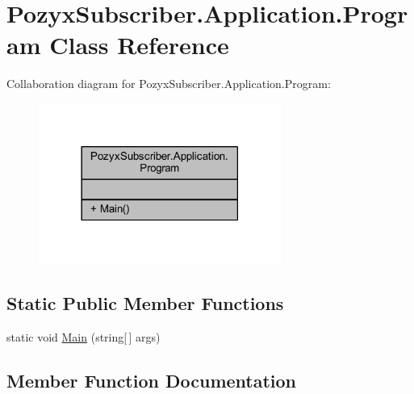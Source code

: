 \hypertarget{class_pozyx_subscriber_1_1_application_1_1_program}{}\section{Pozyx\+Subscriber.\+Application.\+Program Class Reference}
\label{class_pozyx_subscriber_1_1_application_1_1_program}


Collaboration diagram for Pozyx\+Subscriber.\+Application.\+Program\+:
\nopagebreak
\begin{figure}[H]
\begin{center}
\leavevmode
\includegraphics[width=225pt]{class_pozyx_subscriber_1_1_application_1_1_program__coll__graph}
\end{center}
\end{figure}
\subsection*{Static Public Member Functions}
\begin{DoxyCompactItemize}
\item 
static void \hyperlink{class_pozyx_subscriber_1_1_application_1_1_program_a35d33857544887b054b88bb37aeff83c}{Main} (string\mbox{[}$\,$\mbox{]} args)
\end{DoxyCompactItemize}


\subsection{Member Function Documentation}
\mbox{\label{class_pozyx_subscriber_1_1_application_1_1_program_a35d33857544887b054b88bb37aeff83c}} 
